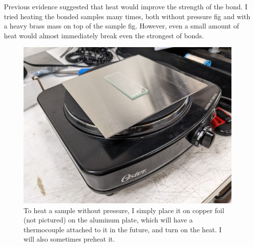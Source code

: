 \documentclass[colorlinks=true,pdfstartview=FitV,linkcolor=blue,
            citecolor=red,urlcolor=magenta]{ligodoc}
\begin{document}
Previous evidence suggested that heat would improve the strength of the bond. I tried heating the bonded samples many times, both without pressure {{{{fig}}}} and with a heavy brass mass on top of the sample {{{fig}}}. However, even a small amount of heat would almost immediately break even the strongest of bonds.

\begin{figure}[htbp]
\begin{center}
\includegraphics[width=6in]{graphics/heat_without_pressure_PXL_20220712_232551854.jpg}
\caption{To heat a sample without pressure, I simply place it on copper foil (not pictured) on the aluminum plate, which will have a thermocouple attached to it in the future, and turn on the heat. I will also sometimes preheat it.}
\label{fig:heat_without_pressure}
\end{center}
\end{figure}
\end{document}
